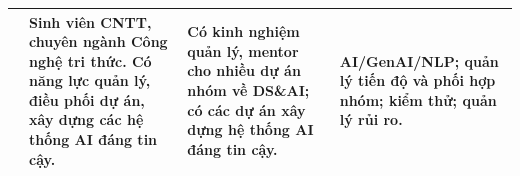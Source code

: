 \begin{table}[H]
\begin{tabularx}{\linewidth}{@{}L{2.55cm}Y Y Y@{}}
        & Sinh viên CNTT, chuyên ngành Công nghệ tri thức. Có năng lực quản lý, điều phối dự án, xây dựng các hệ thống AI đáng tin cậy.
        & Có kinh nghiệm quản lý, mentor cho nhiều dự án nhóm về DS\&AI; có các dự án xây dựng hệ thống AI đáng tin cậy.
        & AI/GenAI/NLP; quản lý tiến độ và phối hợp nhóm; kiểm thử; quản lý rủi ro. \\
        \bottomrule
    \end{tabularx}
\end{table}
